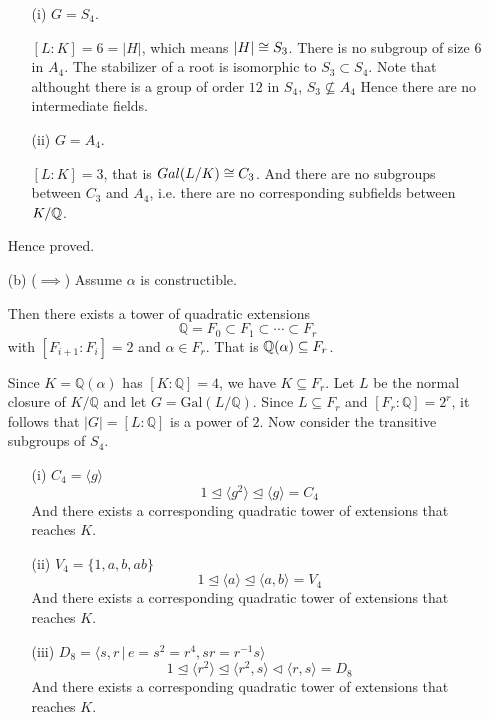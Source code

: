 \documentclass[12pt]{article}
\begin{document}
\begin{solution}
\begin{enumerate}
        \begin{enumerate}
            \item [(i)] $G = S_4$. 

            $[L:K] = 6 = |H|$, which means $|H| \iso S_3$.  There is no subgroup of size $6$ in $A_4$. The stabilizer of a root is isomorphic to $S_3 \subset S_4$. Note that althought there is a group of order $12$ in $S_4$, $S_3 \not \subseteq A_4$ Hence there are no intermediate fields.

            \item [(ii)] $G = A_4$. 
            
            $[L:K] = 3$, that is $Gal(L/K) \iso C_3$. And there are no subgroups between $C_3$ and $A_4$, i.e. there are no corresponding subfields between $K/\Q$. 
        \end{enumerate}

        Hence proved. 

        \item[(b)] 
        ($\implies$) Assume $\alpha$ is constructible. 

        Then there exists a tower of quadratic extensions
        \[ \mathbb{Q} = F_0 \subset F_1 \subset \cdots \subset F_r \]
        with $[F_{i+1}:F_i] = 2$ and $\alpha \in F_r$. That is $\mathbb Q(\alpha) \subseteq F_r$. 

        Since $K = \mathbb{Q}(\alpha)$ has $[K:\mathbb{Q}] = 4$, we have $K \subseteq F_r$. Let $L$ be the normal closure of $K/\mathbb{Q}$ and let  $G = \mathrm{Gal}(L/\mathbb{Q})$.        Since $L \subseteq F_r$ and $[F_r:\mathbb{Q}] = 2^r$, it follows that $|G| = [L:\mathbb{Q}]$ is a power of $2$. Now consider the transitive subgroups of $S_4$. 
        \begin{enumerate}
            \item [(i)] $C_4 = \langle g \rangle$ 
            \[{1} \trianglelefteq \langle g^2 \rangle \trianglelefteq\langle g \rangle = C_4 \]
            And there exists a corresponding quadratic tower of extensions that reaches $K$. 
            \item [(ii)] $V_4 = \{1, a, b, ab\}$ 
            \[{1} \trianglelefteq \langle a \rangle \trianglelefteq\langle a, b\rangle = V_4 \]
            And there exists a corresponding quadratic tower of extensions that reaches $K$. 

            \item [(iii)] $D_8 = \langle s, r \, | \, e = s^2 = r^4 , sr = r^{-1}s \rangle$            
            \[{1} \trianglelefteq \langle r^2 \rangle \trianglelefteq\langle r^2, s \rangle \triangleleft \langle r, s \rangle = D_8 \]
            And there exists a corresponding quadratic tower of extensions that reaches $K$. 



\end{enumerate}
\end{enumerate}
\end{solution}
\end{document}
